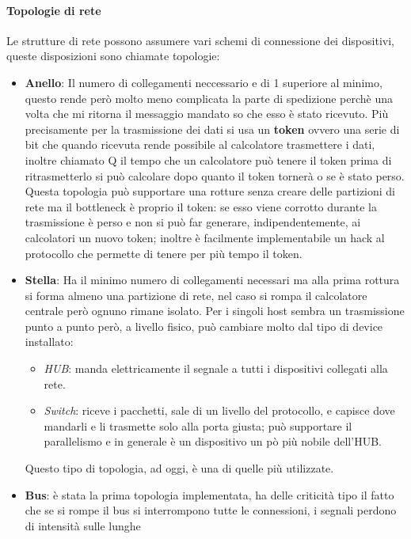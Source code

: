 \documentclass{article}
\begin{document}
\paragraph{Topologie di rete}
Le strutture di rete possono assumere vari schemi di connessione dei
dispositivi, queste disposizioni sono chiamate topologie:
\begin{itemize}
    \item \textbf{Anello}: Il numero di collegamenti neccessario e di 1 superiore al minimo, questo rende però molto meno complicata la parte di spedizione perchè una volta che mi ritorna il messaggio mandato
          so che esso è stato ricevuto. Più precisamente per la trasmissione dei dati si usa un \textbf{token} ovvero una serie di bit che quando ricevuta rende possibile al calcolatore trasmettere i dati, inoltre chiamato Q il
          tempo che un calcolatore può tenere il token prima di ritrasmetterlo si può calcolare dopo quanto il token tornerà o se è stato perso. Questa topologia può supportare una rotture senza creare delle partizioni
          di rete ma il bottleneck è proprio il token: se esso viene corrotto durante la trasmissione è perso e non si può far generare, indipendentemente, ai calcolatori un nuovo token; inoltre è facilmente implementabile
          un hack al protocollo che permette di tenere per più tempo il token.
    \item \textbf{Stella}: Ha il minimo numero di collegamenti necessari ma alla prima rottura si forma almeno una partizione di rete, nel caso si rompa il calcolatore centrale però ognuno rimane isolato.
          Per i singoli host sembra un trasmissione punto a punto però, a livello fisico, può cambiare molto dal tipo di device installato:
          \begin{itemize}
              \item \textit{HUB}: manda elettricamente il segnale a tutti i dispositivi collegati alla rete.
              \item \textit{Switch}: riceve i pacchetti, sale di un livello del protocollo, e capisce dove mandarli e li trasmette solo alla porta giusta; può supportare il parallelismo e in generale è un
                    dispositivo un pò più nobile dell'HUB.
          \end{itemize}
          Questo tipo di topologia, ad oggi, è una di quelle più utilizzate.
    \item \textbf{Bus}: è stata la prima topologia implementata, ha delle criticità tipo il fatto che se si rompe il bus si interrompono tutte le connessioni, i segnali perdono di intensità sulle  lunghe

\end{itemize}
\end{document}
